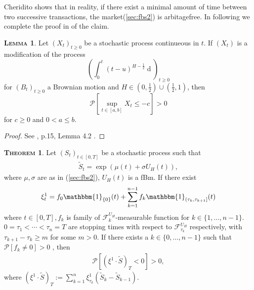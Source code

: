 \documentclass[a4paper, twoside, 11pt]{article}
\theoremstyle{definition}
\newtheorem{theorem}[definition]{\scshape Theorem}
\newtheorem{lemma}[definition]{\scshape Lemma}
\newcommand{\brkt}[1]{\left({#1} \right)}
\begin{document}
  Cheridito shows that in reality, if there exist a minimal amount of time between two successive transactions, the market(\ref{sec:fbs2}) is arbitagefree. In following we complete the proof in \cite{chridito} of the claim.
\begin{lemma}
  Let $(X_t)_{t\ge 0}$ be a stochastic process continueous in $t$. If $(X_t)$ is a modification of the process 
  $$
  \brkt{\int_0^t (t-u)^{H-\frac{1}{2}}\mathop{dB_u}}_{t\ge 0}
  $$
  for $(B_t)_{t\ge 0}$ a Brownian motion and $H\in (0, \frac{1}{2})\cup(\frac{1}{2}, 1)$,
  then 
  $$
  \mathcal{P}[\sup\limits_{t\in[a,b]} X_t \le -c] > 0
  $$
  for $c \ge 0$ and $0< a\le b$.
  \label{sec:lll} 
\end{lemma}

\begin{proof}
  See \cite{chridito}, p.15, Lemma 4.2 .
\end{proof}

\begin{theorem}
  Let $(S_t)_{t\in[0, T]}$ be a stochastic process such that
  \begin{eqnarray}
	\tilde{S}_t = \exp\brkt{\mu(t) + \sigma U_H(t)},
	\label{sec:fbs}
  \end{eqnarray}
  where $\mu, \sigma$ are as in (\ref{sec:fbs2}), $U_H(t)$ is a fBm. If there exist
  \begin{eqnarray*}
  \xi^1_t = f_0\mathbbm{1}_{\{0\}}(t)+\sum_{k=1}^{n-1} f_k \mathbbm{1}_{(\tau_k, \tau_{k+1}]}(t)
  \end{eqnarray*}
  where $t\in[0, T], f_k$ is family of  $\mathcal{F}^{U_H}_k $-measurable function for $k \in \{1,\dots,n-1\}$. $0 = \tau_1 < \cdots <\tau_n = T$ are stopping times with respect to $\mathcal{F}^{U_H}_{\tau_k} $ respectively,  with $\tau_{k+1} - \tau_k\ge m$ for some $m>0$. If there exists a $k \in \{0,\dots,n-1\}$ such that $\mathcal{P}[f_k\neq 0]>0$ , then
  \begin{eqnarray*}
	\mathcal{P}[(\xi^1 \cdot \tilde{S})_T < 0] > 0,
  \end{eqnarray*}
	\label{sec:claim}
	where $(\xi^1 \cdot \tilde{S})_T := \sum_{k=1}^{n} \xi^1_{\tau_k} (\tilde{S}_{k} - \tilde{S}_{k-1})$.
\end{theorem}
\end{document}
